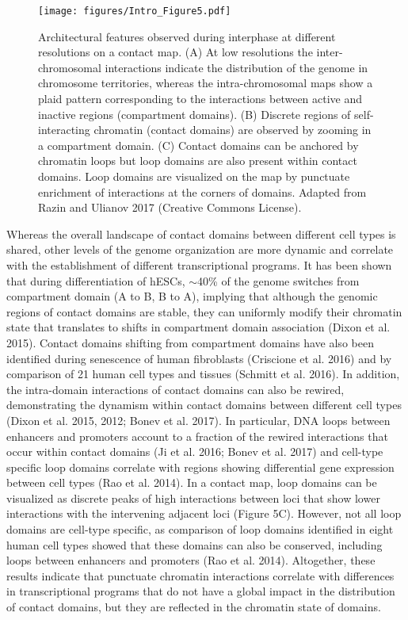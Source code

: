 		\begin{figure}[h!]
			\centering
			\texttt{[image: figures/Intro\_Figure5.pdf]}
  			\caption[intro5]{Architectural features observed during interphase at different resolutions on a contact map. (A) At low resolutions the inter-chromosomal interactions indicate the distribution of the genome in chromosome territories, whereas the intra-chromosomal maps show a plaid pattern corresponding to the interactions between active and inactive regions (compartment domains). (B) Discrete regions of self-interacting chromatin (contact domains) are observed by zooming in a compartment domain. (C) Contact domains can be anchored by chromatin loops but loop domains are also present within contact domains. Loop domains are visualized on the map by punctuate enrichment of interactions at the corners of domains. Adapted from Razin and Ulianov 2017 (Creative Commons License).}
			\label{intro5}
		\end{figure}


Whereas the overall landscape of contact domains between different cell types is shared, other levels of the genome organization are more dynamic and correlate with the establishment of different transcriptional programs. It has been shown that during differentiation of hESCs, $\sim$40\% of the genome switches from compartment domain (A to B, B to A), implying that although the genomic regions of contact domains are stable, they can uniformly modify their chromatin state that translates to shifts in compartment domain association (Dixon et al. 2015). Contact domains shifting from compartment domains have also been identified during senescence of human fibroblasts (Criscione et al. 2016) and by comparison of 21 human cell types and tissues (Schmitt et al. 2016). In addition, the intra-domain interactions of contact domains can also be rewired, demonstrating the dynamism within contact domains between different cell types (Dixon et al. 2015, 2012; Bonev et al. 2017). In particular, DNA loops between enhancers and promoters account to a fraction of the rewired interactions that occur within contact domains (Ji et al. 2016; Bonev et al. 2017) and cell-type specific loop domains correlate with regions showing differential gene expression between cell types (Rao et al. 2014). In a contact map, loop domains can be visualized as discrete peaks of high interactions between loci that show lower interactions with the intervening adjacent loci (Figure 5C). However, not all loop domains are cell-type specific, as comparison of loop domains identified in eight human cell types showed that these domains can also be conserved, including loops between enhancers and promoters (Rao et al. 2014). Altogether, these results indicate that punctuate chromatin interactions correlate with differences in transcriptional programs that do not have a global impact in the distribution of contact domains, but they are reflected in the chromatin state of domains.\\


